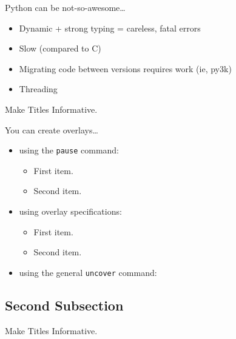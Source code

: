 \documentclass{beamer}
\begin{document}
\begin{frame}{Python can be not-so-awesome\dots}
    \begin{itemize}
            \pause
        \item
            Dynamic + strong typing = careless, fatal errors
            \pause
        \item
            Slow (compared to C)
            \pause
        \item
            Migrating code between versions requires work (ie, py3k)
            \pause
        \item
            Threading
            
    \end{itemize}

\end{frame}




\begin{frame}{Make Titles Informative.}

  You can create overlays\dots
  \begin{itemize}
  \item using the \texttt{pause} command:
    \begin{itemize}
    \item
      First item.
      \pause
    \item    
      Second item.
    \end{itemize}
  \item
    using overlay specifications:
    \begin{itemize}
    \item<3->
      First item.
    \item<4->
      Second item.
    \end{itemize}
  \item
    using the general \texttt{uncover} command:
    \begin{itemize}
    \end{itemize}
  \end{itemize}
\end{frame}


\subsection{Second Subsection}

\begin{frame}{Make Titles Informative.}
\end{frame}
\end{document}
